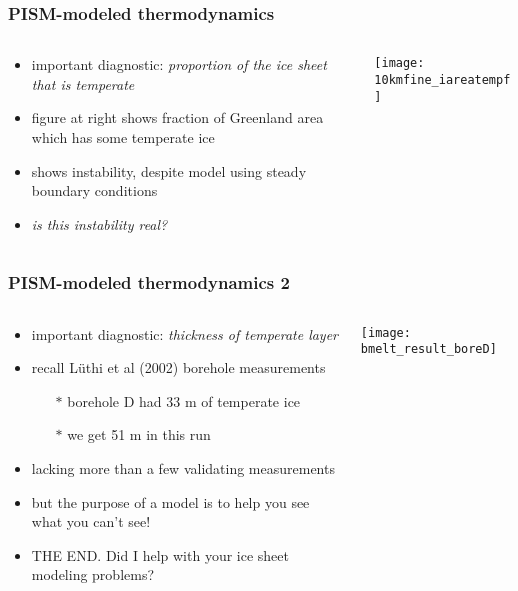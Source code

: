 \documentclass{beamer}
\begin{document}
\begin{frame}
  \frametitle{PISM-modeled thermodynamics}

\begin{columns}
\begin{column}{0.5\textwidth}
\begin{itemize}
\small
\item important diagnostic: \emph{proportion of the ice sheet that is temperate}
\item figure at right shows fraction of Greenland area which has some temperate ice
\item shows instability, despite model using steady boundary conditions
\item \emph{is this instability real?}
\end{itemize}
\end{column}
\begin{column}{0.5\textwidth}
\begin{center}
    \texttt{[image: 10kmfine\_iareatempf]}
  \end{center}
\end{column}
\end{columns}
\end{frame}


\begin{frame}
  \frametitle{PISM-modeled thermodynamics 2}

\begin{columns}
\begin{column}{0.6\textwidth}
\begin{itemize}
\small
\item important diagnostic: \emph{thickness of temperate layer}
\item recall L\"uthi et al (2002) borehole measurements
  \begin{itemize}
  \item[$\ast$] borehole D had 33 m of temperate ice
  \item[$\ast$] we get 51 m in this run
  \end{itemize}
\item lacking more than a few validating measurements
\item but the purpose of a model is to help you see what you can't see!
\item \alert{THE END.}  Did I help with your ice sheet modeling problems?
\end{itemize}
\end{column}
\begin{column}{0.4\textwidth}
\begin{center}
    \texttt{[image: bmelt\_result\_boreD]}
  \end{center}
\end{column}
\end{columns}
\end{frame}
\end{document}
